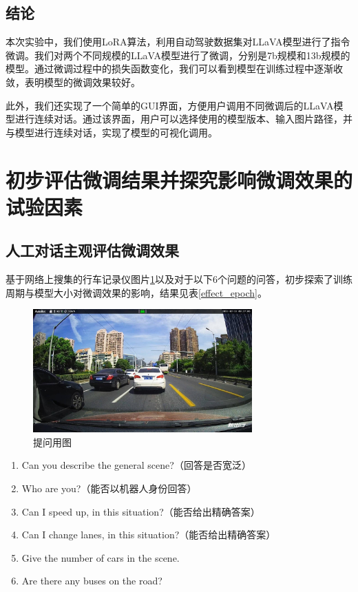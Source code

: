 \documentclass[
    linespread = 1.25
]{ctexart}
\begin{document}
\subsection{结论}

本次实验中，我们使用LoRA算法，利用自动驾驶数据集对LLaVA模型进行了指令微调。我们对两个不同规模的LLaVA模型进行了微调，分别是7b规模和13b规模的模型。通过微调过程中的损失函数变化，我们可以看到模型在训练过程中逐渐收敛，表明模型的微调效果较好。

此外，我们还实现了一个简单的GUI界面，方便用户调用不同微调后的LLaVA模型进行连续对话。通过该界面，用户可以选择使用的模型版本、输入图片路径，并与模型进行连续对话，实现了模型的可视化调用。

\section{初步评估微调结果并探究影响微调效果的试验因素}
\subsection{人工对话主观评估微调效果}

基于网络上搜集的行车记录仪图片\ref{R.jpg}以及对于以下6个问题的问答，初步探索了训练周期与模型大小对微调效果的影响，结果见表\ref{effect_epoch}。

\begin{figure}[ht] 
    \centering 
    \includegraphics[width=0.75\textwidth]{R.jpg}
    \caption{提问用图} 
    \label{R.jpg} %
\end{figure}

\begin{enumerate} 
    \item Can you describe the general scene?（回答是否宽泛）
    \item Who are you?（能否以机器人身份回答）
    \item Can I speed up, in this situation?（能否给出精确答案）
    \item Can I change lanes, in this situation?（能否给出精确答案）
    \item Give the number of cars in the scene.
    \item Are there any buses on the road?
\end{enumerate}
\end{document}
